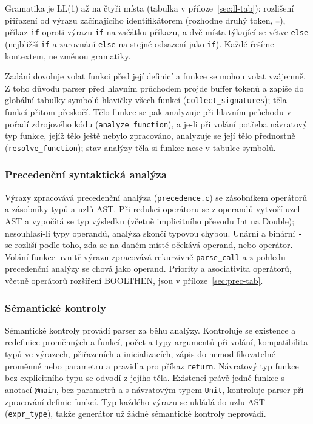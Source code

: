 \documentclass[11pt]{article}
\newif\ifdraft
\newcommand{\todo}[1]{\ifdraft{\color{red}\textbf{[TODO: #1]}}\fi}
\newcommand{\file}[1]{\texttt{#1}}                   %
\newcommand{\ic}[1]{\texttt{#1}}                     %
\begin{document}
Gramatika je LL(1) až na čtyři místa (tabulka v příloze~\ref{sec:ll-tab}): rozlišení přiřazení od výrazu začínajícího identifikátorem (rozhodne druhý token, \texttt{=}), příkaz \texttt{if} oproti výrazu \texttt{if} na začátku příkazu, a dvě místa týkající se větve \texttt{else} (nejbližší \texttt{if} a zarovnání \texttt{else} na stejné odsazení jako \texttt{if}). Každé řešíme kontextem, ne změnou gramatiky.

Zadání dovoluje volat funkci před její definicí a funkce se mohou volat vzájemně. Z toho důvodu parser před hlavním průchodem projde buffer tokenů a zapíše do globální tabulky symbolů hlavičky všech funkcí (\texttt{collect\_signatures}); těla funkcí přitom přeskočí. Tělo funkce se pak analyzuje při hlavním průchodu v pořadí zdrojového kódu (\texttt{analyze\_function}), a je-li při volání potřeba návratový typ funkce, jejíž tělo ještě nebylo zpracováno, analyzuje se její tělo přednostně (\texttt{resolve\_function}); stav analýzy těla si funkce nese v tabulce symbolů. \todo{ověřit popis proti precedence.c}

\subsubsection{Precedenční syntaktická analýza}
\label{sec:prec}

Výrazy zpracovává precedenční analýza (\file{precedence.c}) se zásobníkem operátorů a zásobníky typů a uzlů AST. Při redukci operátoru se z operandů vytvoří uzel AST a vypočítá se typ výsledku (včetně implicitního převodu Int na Double); nesouhlasí-li typy operandů, analýza skončí typovou chybou. Unární a binární \texttt{-} se rozliší podle toho, zda se na daném místě očekává operand, nebo operátor. Volání funkce uvnitř výrazu zpracovává rekurzivně \texttt{parse\_call} a z pohledu precedenční analýzy se chová jako operand. Priority a asociativita operátorů, včetně operátorů rozšíření BOOLTHEN, jsou v příloze~\ref{sec:prec-tab}.

\subsubsection{Sémantické kontroly}

Sémantické kontroly provádí parser za běhu analýzy. Kontroluje se existence a redefinice proměnných a funkcí, počet a typy argumentů při volání, kompatibilita typů ve výrazech, přiřazeních a inicializacích, zápis do nemodifikovatelné proměnné nebo parametru a pravidla pro příkaz \texttt{return}. Návratový typ funkce bez explicitního typu se odvodí z jejího těla. Existenci právě jedné funkce s anotací \ic{@main}, bez parametrů a s návratovým typem \texttt{Unit}, kontroluje parser při zpracování definic funkcí. Typ každého výrazu se ukládá do uzlu AST (\texttt{expr\_type}), takže generátor už žádné sémantické kontroly neprovádí.
\end{document}
